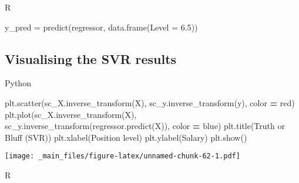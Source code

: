 \documentclass[
]{book}
\newenvironment{Shaded}{\begin{snugshade}}{\end{snugshade}}
\newcommand{\AttributeTok}[1]{\textcolor[rgb]{0.77,0.63,0.00}{#1}}
\newcommand{\FloatTok}[1]{\textcolor[rgb]{0.00,0.00,0.81}{#1}}
\newcommand{\FunctionTok}[1]{\textcolor[rgb]{0.00,0.00,0.00}{#1}}
\newcommand{\NormalTok}[1]{#1}
\newcommand{\OperatorTok}[1]{\textcolor[rgb]{0.81,0.36,0.00}{\textbf{#1}}}
\newcommand{\OtherTok}[1]{\textcolor[rgb]{0.56,0.35,0.01}{#1}}
\newcommand{\StringTok}[1]{\textcolor[rgb]{0.31,0.60,0.02}{#1}}
\theoremstyle{definition}
\theoremstyle{definition}
\theoremstyle{definition}
\theoremstyle{definition}
\theoremstyle{remark}
\begin{document}
R

\begin{Shaded}
\begin{Highlighting}[]
\NormalTok{y\_pred }\OtherTok{=} \FunctionTok{predict}\NormalTok{(regressor, }\FunctionTok{data.frame}\NormalTok{(}\AttributeTok{Level =} \FloatTok{6.5}\NormalTok{))}
\end{Highlighting}
\end{Shaded}

\hypertarget{visualising-the-svr-results}{%
\subsection{Visualising the SVR results}\label{visualising-the-svr-results}}

Python

\begin{Shaded}
\begin{Highlighting}[]
\NormalTok{plt.scatter(sc\_X.inverse\_transform(X), sc\_y.inverse\_transform(y), color }\OperatorTok{=} \StringTok{\textquotesingle{}red\textquotesingle{}}\NormalTok{)}
\NormalTok{plt.plot(sc\_X.inverse\_transform(X), sc\_y.inverse\_transform(regressor.predict(X)), color }\OperatorTok{=} \StringTok{\textquotesingle{}blue\textquotesingle{}}\NormalTok{)}
\NormalTok{plt.title(}\StringTok{\textquotesingle{}Truth or Bluff (SVR)\textquotesingle{}}\NormalTok{)}
\NormalTok{plt.xlabel(}\StringTok{\textquotesingle{}Position level\textquotesingle{}}\NormalTok{)}
\NormalTok{plt.ylabel(}\StringTok{\textquotesingle{}Salary\textquotesingle{}}\NormalTok{)}
\NormalTok{plt.show()}
\end{Highlighting}
\end{Shaded}

\texttt{[image: \_main\_files/figure-latex/unnamed-chunk-62-1.pdf]}

R
\end{document}
